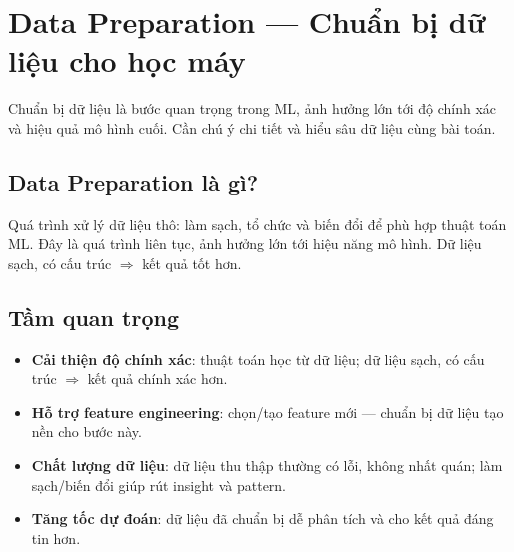 \section{Data Preparation --- Chuẩn bị dữ liệu cho học máy}

\begin{dongco}[title={Bước then chốt ảnh hưởng mạnh tới mô hình}]
Chuẩn bị dữ liệu là bước quan trọng trong ML, ảnh hưởng lớn tới độ chính xác và hiệu quả mô hình cuối.
Cần chú ý chi tiết và hiểu sâu dữ liệu cùng bài toán.
\end{dongco}

\subsection{Data Preparation là gì?}

\begin{dinhnghia}[title={Data preparation}]
Quá trình xử lý dữ liệu thô: làm sạch, tổ chức và biến đổi để phù hợp thuật toán ML.
Đây là quá trình liên tục, ảnh hưởng lớn tới hiệu năng mô hình.
Dữ liệu sạch, có cấu trúc $\Rightarrow$ kết quả tốt hơn.
\end{dinhnghia}

\begin{vidu}[title={Sơ đồ quy trình chuẩn bị dữ liệu}]
\end{vidu}

\subsection{Tầm quan trọng}

\begin{phuongphap}[title={Vì sao chuẩn bị dữ liệu quan trọng}]
\begin{itemize}
  \item \textbf{Cải thiện độ chính xác}: thuật toán học từ dữ liệu; dữ liệu sạch, có cấu trúc $\Rightarrow$ kết quả chính xác hơn.
  \item \textbf{Hỗ trợ feature engineering}: chọn/tạo feature mới --- chuẩn bị dữ liệu tạo nền cho bước này.
  \item \textbf{Chất lượng dữ liệu}: dữ liệu thu thập thường có lỗi, không nhất quán; làm sạch/biến đổi giúp rút insight và pattern.
  \item \textbf{Tăng tốc dự đoán}: dữ liệu đã chuẩn bị dễ phân tích và cho kết quả đáng tin hơn.
\end{itemize}
\end{phuongphap}

